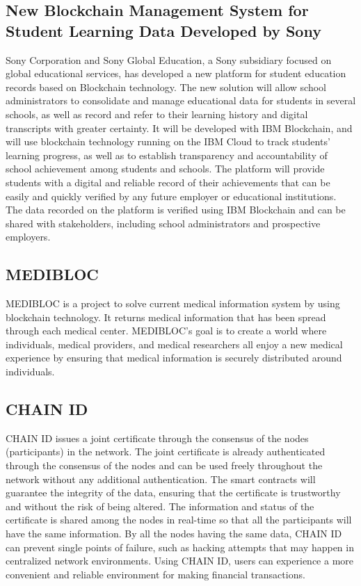 \documentclass[conference]{IEEEtran}
\begin{document}
\subsection{New Blockchain Management System for Student Learning Data Developed by Sony}
Sony Corporation and Sony Global Education, a Sony subsidiary focused on global educational services, has developed a new platform for student education records based on Blockchain technology. The new solution will allow school administrators to consolidate and manage educational data for students in several schools, as well as record and refer to their learning history and digital transcripts with greater certainty. It will be developed with IBM Blockchain, and will use blockchain technology running on the IBM Cloud to track students’ learning progress, as well as to establish transparency and accountability of school achievement among students and schools. The platform will provide students with a digital and reliable record of their achievements that can be easily and quickly verified by any future employer or educational institutions. The data recorded on the platform is verified using IBM Blockchain and can be shared with stakeholders, including school administrators and prospective employers.

\subsection{MEDIBLOC}
MEDIBLOC is a project to solve current medical information system by using blockchain technology. It returns medical information that has been spread through each medical center. MEDIBLOC's goal is to create a world where individuals, medical providers, and medical researchers all enjoy a new medical experience by ensuring that medical information is securely distributed around individuals.

\subsection{CHAIN ID}
CHAIN ID issues a joint certificate through the consensus of the nodes (participants) in the network. The joint certificate is already authenticated through the consensus of the nodes and can be used freely throughout the network without any additional authentication. The smart contracts will guarantee the integrity of the data, ensuring that the certificate is trustworthy and without the risk of being altered. The information and status of the certificate is shared among the nodes in real-time so that all the participants will have the same information. By all the nodes having the same data, CHAIN ID can prevent single points of failure, such as hacking attempts that may happen in centralized network environments. Using CHAIN ID, users can experience a more convenient and reliable environment for making financial transactions.
\end{document}
